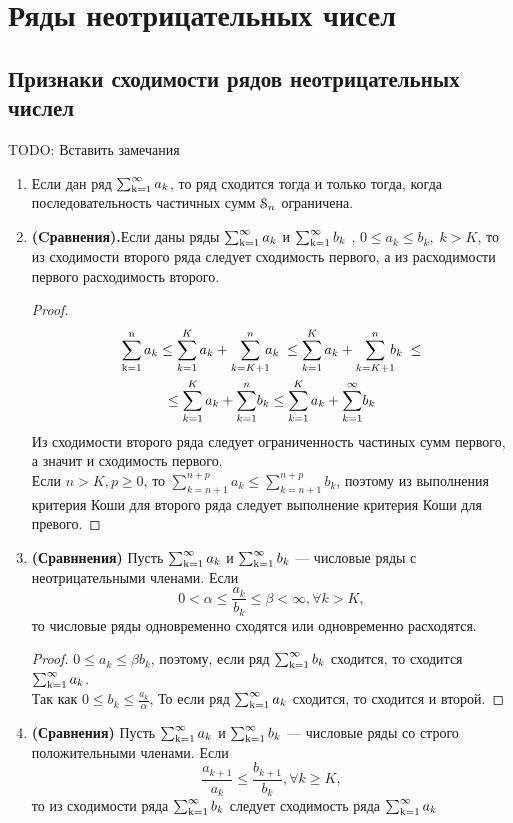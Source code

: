   \chapter{Ряды неотрицательных чисел}
\section*{Признаки сходимости рядов неотрицательных числел}
TODO: Вставить замечания
\begin{enumerate}
\item
Если дан ряд $\operatorname{\sum_{k=1}^{\infty}} a_k$, то ряд сходится тогда и только тогда, когда последовательность частичных сумм $\operatorname{\EuScript{S}}_n$ ограничена.
\item
\textbf{(Cравнения).}Если даны  ряды $\operatorname{\sum_{k=1}^{\infty}} a_k $ и $\operatorname{\sum_{k=1}^{\infty}} b_k$ , $0 \le a_k \le b_k,\; k> K$, то из сходимости второго ряда следует сходимость первого, а из расходимости первого расходимость второго.
\begin{proof}
\begin{multline*}
\ssumn a_k \le \sum_{k=1}^{K} a_k + \sum_{k=K+1}^{n}\!\!\! a_k \; \le \sum_{k=1}^{K} a_k + {\sum_{k=K+1}^{n} \!\!\! b_k}\; \le \\
\le \sum_{k=1}^{K}a_k + \sum_{k=1}^n\! b_k \le \sum_{k=1}^{K}a_k +\sum_{k=1}^{\infty}\! b_k
\end{multline*}
Из сходимости второго ряда следует ограниченность частиных сумм первого, а значит и сходимость первого.\\
Если $n>K, p \ge 0$, то $\sum_{k=n+1}^{n+p}a_k \le \sum_{k=n+1}^{n+p} b_k$, поэтому из выполнения критерия Коши для второго ряда следует выполнение критерия Коши для превого. 
\end{proof}
\item
\textbf{(Сравннения)} Пусть $\operatorname{\sum_{k=1}^{\infty}} a_k $ и $\operatorname{\sum_{k=1}^{\infty}} b_k$ --- числовые ряды с неотрицательными членами. Если $$0 < \alpha \le \frac{a_k}{b_k} \le \beta < \infty, \forall k>K,$$
то числовые ряды одновременно сходятся или одновременно расходятся.
\begin{proof}
$0 \le a_k \le \beta b_k$, поэтому, если ряд $\operatorname{\sum_{k=1}^{\infty}} b_k$ сходится, то сходится $\operatorname{\sum_{k=1}^{\infty}} a_k$.\\
Так как $0 \le b_k \le \frac{a_k}{\alpha}$,
То если ряд $\operatorname{\sum_{k=1}^{\infty}} a_k$ сходится, то сходится и второй.
\end{proof}
\item
\textbf{(Сравнения)} Пусть $\operatorname{\sum_{k=1}^{\infty}} a_k $ и $\operatorname{\sum_{k=1}^{\infty}} b_k$ --- числовые ряды со строго положительными членами. Если
$$ \frac{a_{k+1}}{a_k}\le \frac{b_{k+1}}{b_k}, \forall k \ge K,$$
то из сходимости ряда $\operatorname{\sum_{k=1}^{\infty}} b_k$ следует сходимость ряда $\operatorname{\sum_{k=1}^{\infty}} a_k$

\end{enumerate}
